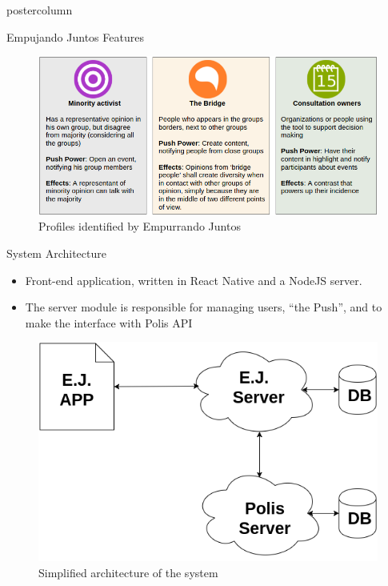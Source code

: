 \documentclass[final,hyperref={pdfpagelabels=false}]{beamer}
\begin{document}
\begin{frame}
\begin{columns}
\begin{column}{.49\textwidth}
\begin{beamercolorbox}[center,wd=\textwidth]{postercolumn}
\begin{minipage}[T]{.95\textwidth}
{\begin{block}{Empujando Juntos Features}
\begin{itemize}
    \begin{figure}
      \begin{center}
        \includegraphics[scale=1.4]{../images/userprofiles.png}
        \caption{Profiles identified by Empurrando Juntos}
        \label{fig:user-profiles}
      \end{center}
    \end{figure}
  \end{itemize}
\end{block}

\begin{block}{System Architecture}
	\begin{itemize}
    \item Front-end application, written in React Native
    and a NodeJS server.

    \item The server module is responsible for managing users, ``the Push'', and
    to make the interface with Polis API
  \end{itemize}

  \begin{figure}
    \begin{center}
      \includegraphics[scale=1.3]{../images/polis4.png}
      \caption{Simplified architecture of the system}
      \label{fig:architecture}
    \end{center}
  \end{figure}
\end{block}

}
\end{minipage}
\end{beamercolorbox}
\end{column}
\end{columns}
\end{frame}
\end{document}
